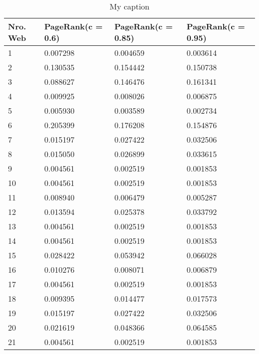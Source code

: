 \begin{table}[]
\centering
\caption{My caption}
\label{my-label}
\begin{tabular}{llll}
\hline
Nro. Web & PageRank(c = 0.6) & PageRank(c = 0.85) & PageRank(c = 0.95) \\ \hline
1        & 0.007298          & 0.004659           & 0.003614           \\
2        & 0.130535          & 0.154442           & 0.150738           \\
3        & 0.088627          & 0.146476           & 0.161341           \\
4        & 0.009925          & 0.008026           & 0.006875           \\
5        & 0.005930          & 0.003589           & 0.002734           \\
6        & 0.205399          & 0.176208           & 0.154876           \\
7        & 0.015197          & 0.027422           & 0.032506           \\
8        & 0.015050          & 0.026899           & 0.033615           \\
9        & 0.004561          & 0.002519           & 0.001853           \\
10       & 0.004561          & 0.002519           & 0.001853           \\
11       & 0.008940          & 0.006479           & 0.005287           \\
12       & 0.013594          & 0.025378           & 0.033792           \\
13       & 0.004561          & 0.002519           & 0.001853           \\
14       & 0.004561          & 0.002519           & 0.001853           \\
15       & 0.028422          & 0.053942           & 0.066028           \\
16       & 0.010276          & 0.008071           & 0.006879           \\
17       & 0.004561          & 0.002519           & 0.001853           \\
18       & 0.009395          & 0.014477           & 0.017573           \\
19       & 0.015197          & 0.027422           & 0.032506           \\
20       & 0.021619          & 0.048366           & 0.064585           \\
21       & 0.004561          & 0.002519           & 0.001853           \\

\end{tabular}
\end{table}
